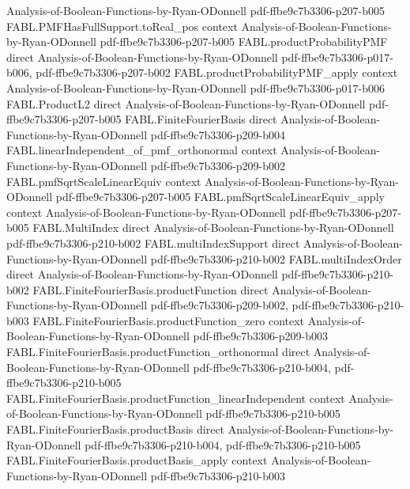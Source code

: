 \begin{theorem}
  {Analysis-of-Boolean-Functions-by-Ryan-ODonnell}
  {pdf-ffbe9c7b3306-p207-b005}
\proofstep
  {FABL.PMFHasFullSupport.toReal_pos}
  {context}
  {Analysis-of-Boolean-Functions-by-Ryan-ODonnell}
  {pdf-ffbe9c7b3306-p207-b005}
\proofstep
  {FABL.productProbabilityPMF}
  {direct}
  {Analysis-of-Boolean-Functions-by-Ryan-ODonnell}
  {pdf-ffbe9c7b3306-p017-b006,
    pdf-ffbe9c7b3306-p207-b002}
\proofstep
  {FABL.productProbabilityPMF_apply}
  {context}
  {Analysis-of-Boolean-Functions-by-Ryan-ODonnell}
  {pdf-ffbe9c7b3306-p017-b006}
\proofstep
  {FABL.ProductL2}
  {direct}
  {Analysis-of-Boolean-Functions-by-Ryan-ODonnell}
  {pdf-ffbe9c7b3306-p207-b005}
\proofstep
  {FABL.FiniteFourierBasis}
  {direct}
  {Analysis-of-Boolean-Functions-by-Ryan-ODonnell}
  {pdf-ffbe9c7b3306-p209-b004}
\proofstep
  {FABL.linearIndependent_of_pmf_orthonormal}
  {context}
  {Analysis-of-Boolean-Functions-by-Ryan-ODonnell}
  {pdf-ffbe9c7b3306-p209-b002}
\proofstep
  {FABL.pmfSqrtScaleLinearEquiv}
  {context}
  {Analysis-of-Boolean-Functions-by-Ryan-ODonnell}
  {pdf-ffbe9c7b3306-p207-b005}
\proofstep
  {FABL.pmfSqrtScaleLinearEquiv_apply}
  {context}
  {Analysis-of-Boolean-Functions-by-Ryan-ODonnell}
  {pdf-ffbe9c7b3306-p207-b005}
\proofstep
  {FABL.MultiIndex}
  {direct}
  {Analysis-of-Boolean-Functions-by-Ryan-ODonnell}
  {pdf-ffbe9c7b3306-p210-b002}
\proofstep
  {FABL.multiIndexSupport}
  {direct}
  {Analysis-of-Boolean-Functions-by-Ryan-ODonnell}
  {pdf-ffbe9c7b3306-p210-b002}
\proofstep
  {FABL.multiIndexOrder}
  {direct}
  {Analysis-of-Boolean-Functions-by-Ryan-ODonnell}
  {pdf-ffbe9c7b3306-p210-b002}
\proofstep
  {FABL.FiniteFourierBasis.productFunction}
  {direct}
  {Analysis-of-Boolean-Functions-by-Ryan-ODonnell}
  {pdf-ffbe9c7b3306-p209-b002,
    pdf-ffbe9c7b3306-p210-b003}
\proofstep
  {FABL.FiniteFourierBasis.productFunction_zero}
  {context}
  {Analysis-of-Boolean-Functions-by-Ryan-ODonnell}
  {pdf-ffbe9c7b3306-p209-b003}
\proofstep
  {FABL.FiniteFourierBasis.productFunction_orthonormal}
  {direct}
  {Analysis-of-Boolean-Functions-by-Ryan-ODonnell}
  {pdf-ffbe9c7b3306-p210-b004,
    pdf-ffbe9c7b3306-p210-b005}
\proofstep
  {FABL.FiniteFourierBasis.productFunction_linearIndependent}
  {context}
  {Analysis-of-Boolean-Functions-by-Ryan-ODonnell}
  {pdf-ffbe9c7b3306-p210-b005}
\proofstep
  {FABL.FiniteFourierBasis.productBasis}
  {direct}
  {Analysis-of-Boolean-Functions-by-Ryan-ODonnell}
  {pdf-ffbe9c7b3306-p210-b004,
    pdf-ffbe9c7b3306-p210-b005}
\proofstep
  {FABL.FiniteFourierBasis.productBasis_apply}
  {context}
  {Analysis-of-Boolean-Functions-by-Ryan-ODonnell}
  {pdf-ffbe9c7b3306-p210-b003}

\end{theorem}
